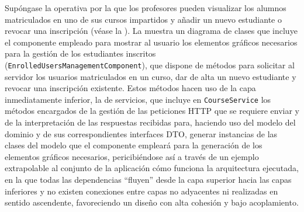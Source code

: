 Supóngase la operativa por la que los profesores pueden visualizar los alumnos matriculados en uno de sus cursos impartidos y añadir un nuevo estudiante o revocar una inscripción (véase la ). La  muestra un diagrama de clases que incluye el componente empleado para mostrar al usuario los elementos gráficos necesarios para la gestión de los estudiantes inscritos (\texttt{EnrolledUsersManagementComponent}), que dispone de métodos para solicitar al servidor los usuarios matriculados en un curso, dar de alta un nuevo estudiante y revocar una inscripción existente. Estos métodos hacen uso de la capa inmediatamente inferior, la de servicios, que incluye en \texttt{CourseService} los métodos encargados de la gestión de las peticiones HTTP que se requiere enviar y de la interpretación de las respuestas recibidas para, haciendo uso del modelo del dominio y de sus correspondientes interfaces DTO, generar instancias de las clases del modelo que el componente empleará para la generación de los elementos gráficos necesarios, pericibiéndose así a través de un ejemplo extrapolable al conjunto de la aplicación cómo funciona la arquitectura ejecutada, en la que todas las dependencias ``fluyen'' desde la capa superior hacia las capas inferiores y no existen conexiones entre capas no adyacentes ni realizadas en sentido ascendente, favoreciendo un diseño con alta cohesión y bajo acoplamiento.

